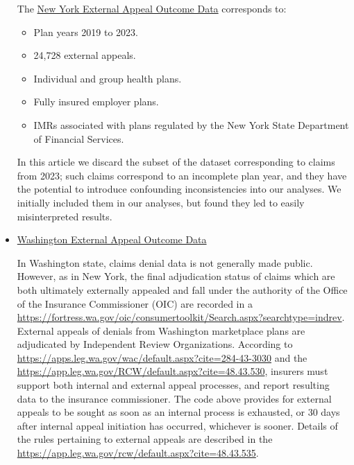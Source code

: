 \documentclass[12pt, a4paper,twoside]{report}
\theoremstyle{plain} %
\theoremstyle{definition} %
\theoremstyle{remark} %
\numberwithin{equation}{chapter}
\begin{document}
\begin{itemize}
\begin{tcolorbox}
			The \href{https://www.dfs.ny.gov/public-appeal/search}{New York External Appeal Outcome Data} corresponds to:
			
			\begin{itemize}
				\item Plan years 2019 to 2023.
				\item 24,728 external appeals.
				\item Individual and group health plans.
				\item Fully insured employer plans.
				\item IMRs associated with plans regulated by the New York State Department of Financial Services.
				
			\end{itemize}
		
			In this article we discard the subset of the dataset corresponding to claims from 2023; such claims correspond to an incomplete plan year, and they have the potential to introduce confounding inconsistencies into our analyses. We initially included them in our analyses, but found they led to easily misinterpreted results.
		
			\end{tcolorbox}
			
			\item \href{https://fortress.wa.gov/oic/consumertoolkit/Search.aspx?searchtype=indrev}{Washington External Appeal Outcome Data}\\
			
			\begin{tcolorbox}
				
			In Washington state, claims denial data is not generally made public. However, as in New York, the final adjudication status of claims which are both ultimately externally appealed and fall under the authority of the Office of the Insurance Commissioner (OIC) are recorded in a \href{publicly accessible dataset}{https://fortress.wa.gov/oic/consumertoolkit/Search.aspx?searchtype=indrev}.\\
			
			External appeals of denials from Washington marketplace plans are adjudicated by Independent Review Organizations. According to \href{Washington Administrative Code 284-43-3030}{https://apps.leg.wa.gov/wac/default.aspx?cite=284-43-3030} and the \href{Revised Code of Washington 48.43.530}{https://app.leg.wa.gov/RCW/default.aspx?cite=48.43.530}, insurers must support both internal and external appeal processes, and report resulting data to the insurance commissioner. The code above provides for external appeals to be sought as soon as an internal process is exhausted, or 30 days after internal appeal initiation has occurred, whichever is sooner. Details of the rules pertaining to external appeals are described in the \href{Revised Code of Washington 48.43.535}{https://app.leg.wa.gov/rcw/default.aspx?cite=48.43.535}.\\
			

\end{tcolorbox}
\end{itemize}
\end{document}
